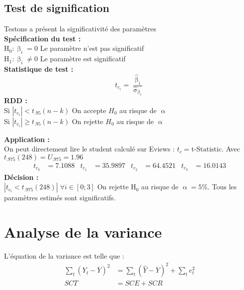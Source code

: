 \documentclass[A4paper]{article}
\begin{document}
\subsection{Test de signification}
Testons a présent la significativité des paramètres \\
\textbf{Spécification du test :} \\
$\text{H}_0 : \upbeta_i = 0$ Le paramètre n'est pas significatif\\
$\text{H}_1 : \upbeta_i \neq 0$ Le paramètre est significatif \\
\textbf{Statistique de test :}
\begin{equation*}
		t_{c_i} = \frac{\hat{\upbeta}_i}{\hat{\upsigma}_{\upbeta_i}}
\end{equation*}
\textbf{RDD : } \\
Si $\left| t_{c_i} \right|  < t_{.95}(n-k)$ On accepte $H_0$ au risque de $\upalpha$\\
Si $\left| t_{c_i} \right|  \geq t_{.95}(n-k)$ On rejette $H_0$ au risque de $\upalpha$		

\textbf{Application :} \\
On peut directement lire le student calculé sur Eviews : $t_c = \text{t-Statistic}$. Avec $t_{.975}(248) =  U_{.975} = 1.96$ 
\begin{align*}
		t_{c_0} &= 7.1088 & t_{c_1} &= 35.9897 & t_{c_2} &= 64.4521 & t_{c_3} &= 16.0143
\end{align*}
\textbf{Décision : } \\
$\left| t_{c_i} < t_{.975}(248) \right| \; \forall i \in [0;3]$ \; On rejette H$_0$ au risque de $\upalpha = 5\%$. Tous les paramètres estimés sont significatifs.

\newpage
\section{Analyse de la variance}
L'équation de la variance est telle que : 
\begin{equation*}
\begin{split}
		\sum_t \left( Y_t - \overline{Y}\right)^2 &= \sum_t \left( \hat{Y} - \overline{Y} \right)^2 + \sum_t e_t^2 \\
		SCT &= SCE + SCR
\end{split}
\end{equation*}
\end{document}
